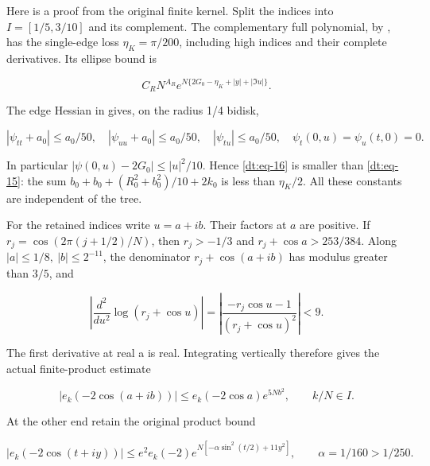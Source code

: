 Here is a proof from the original finite kernel. Split the indices into
\(I=[1/5,3/10]\) and its complement. The complementary full polynomial, by \cite[Lemma~2.1 and equation~(2.7)]{Summed}, has the single-edge loss \(\eta_K=\pi/200\), including high
indices and their complete derivatives. Its ellipse bound is

\begin{equation}\label{dt:eq-16}
C_RN^{A_R}
       e^{N\{2G_0-\eta_K+|y|+|\Im u|\}}.
\end{equation}

The edge Hessian in \cite[equation~(4.3)]{Summed} gives, on the radius 1/4 bidisk,

\begin{equation}\label{dt:eq-17}
|\psi_{tt}+a_0|\le a_0/50,
 \quad |\psi_{uu}+a_0|\le a_0/50,
 \quad |\psi_{tu}|\le a_0/50,
 \quad \psi_t(0,u)=\psi_u(t,0)=0.
\end{equation}

In particular \(|\psi(0,u)-2G_0|\le |u|^2/10\). Hence \eqref{dt:eq-16} is smaller
than \eqref{dt:eq-15}: the sum \(b_0+b_0+(R_0^2+b_0^2)/10+2k_0\) is less
than \(\eta_K/2\). All these constants are independent of the tree.

For the retained indices write \(u=a+ib\). Their factors at \(a\) are positive.
If \(r_j=\cos(2\pi(j+1/2)/N)\), then \(r_j>-1/3\) and
\(r_j+\cos a>253/384\). Along \(|a|\le1/8,\ |b|\le2^{-11}\), the denominator
\(r_j+\cos(a+ib)\) has modulus greater than \(3/5\), and

\begin{equation}\label{dt:eq-18}
\left|\frac{d^2}{du^2}\log(r_j+\cos u)\right|
 =\left|\frac{-r_j\cos u-1}{(r_j+\cos u)^2}\right|<9.
\end{equation}

The first derivative at real a is real. Integrating vertically therefore
gives the actual finite-product estimate

\begin{equation}\label{dt:eq-19}
|e_k(-2\cos(a+ib))|
       \le e_k(-2\cos a)e^{5Nb^2},\qquad k/N\in I.
\end{equation}

At the other end retain the original product bound

\begin{equation}\label{dt:eq-20}
|e_k(-2\cos(t+iy))|
   \le e^2e_k(-2)e^{N[-\alpha\sin^2(t/2)+11y^2]},
                       \qquad \alpha=1/160>1/250.
\end{equation}

